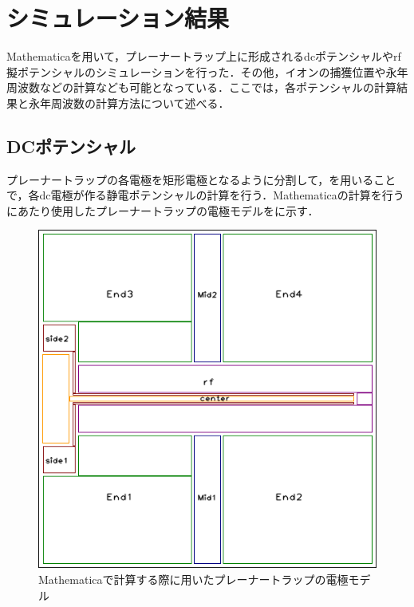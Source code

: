 \chapter{シミュレーション結果}
Mathematicaを用いて，プレーナートラップ上に形成されるdcポテンシャルやrf擬ポテンシャルのシミュレーションを行った．その他，イオンの捕獲位置や永年周波数などの計算なども可能となっている．ここでは，各ポテンシャルの計算結果と永年周波数の計算方法について述べる．
\section{DCポテンシャル}
プレーナートラップの各電極を矩形電極となるように分割して，を用いることで，各dc電極が作る静電ポテンシャルの計算を行う．Mathematicaの計算を行うにあたり使用したプレーナートラップの電極モデルをに示す．

\begin{figure}[h]
	\begin{center}
		\includegraphics[width = 0.4\linewidth]{./simulation/figure/named_rect_electrode.png}
	\end{center}
	\caption{Mathematicaで計算する際に用いたプレーナートラップの電極モデル}
	\label{fig:rect_electrode}
\end{figure}

